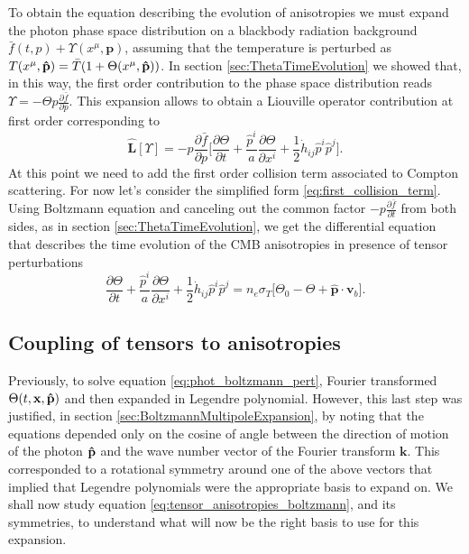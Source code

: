 To obtain the equation describing the evolution of anisotropies we must expand the photon phase space distribution on a blackbody radiation background $\bar{f}(t,p)+\Upsilon(x^\mu,\mathbf p) $, assuming that the temperature is perturbed as $T(x^\mu,\mathbf{\hat{p}})=\bar T (1+\Theta(x^\mu,\mathbf{\hat{p}}))$. In section \ref{sec:ThetaTimeEvolution} we showed that, in this way, the first order contribution to the phase space distribution reads $\Upsilon=-\Theta p\frac{\partial\bar f}{\partial p}$. This expansion allows to obtain a Liouville operator contribution at first order corresponding to 
$$\hat{\mathbf{L}}[\Upsilon]=-p\frac{\partial \bar f}{\partial p}\bigg[\frac{\partial \Theta}{\partial t}+\frac{\hat p^i}{a}\frac{\partial \Theta}{\partial x^i}+\frac{1}{2}\dot{h}_{ij}\hat p^i\hat p^j\bigg].$$
At this point we need to add the first order collision term associated to Compton scattering. For now let's consider the simplified form \eqref{eq:first_collision_term}. Using Boltzmann equation and canceling out the common factor $-p\frac{\partial\bar f}{\partial t}$ from both sides, as in section \ref{sec:ThetaTimeEvolution}, we get the differential equation that describes the time evolution of the CMB anisotropies in presence of tensor perturbations
\begin{equation}
    \label{eq:tensor_anisotropies_boltzmann}
    \frac{\partial \Theta}{\partial t}+\frac{\hat p^i}{a}\frac{\partial \Theta}{\partial x^i}+\frac{1}{2}\dot{h}_{ij}\hat p^i\hat p^j=n_{e}\sigma_T\bigg[\Theta_0-\Theta+\mathbf{\hat{p}}\cdot\mathbf{v}_{b}\bigg].
\end{equation}
\subsection{Coupling of tensors to anisotropies}
Previously, to solve equation \eqref{eq:phot_boltzmann_pert}, Fourier transformed $\Theta(t,\mathbf{x},\mathbf{\hat{p}})$ and then expanded in Legendre polynomial. However, this last step was justified, in section \ref{sec:BoltzmannMultipoleExpansion}, by noting that the equations depended only on the cosine of angle between the direction of motion of the photon $\mathbf{\hat{p}}$ and the wave number vector of the Fourier transform $\mathbf{k}$. This corresponded to a rotational symmetry around one of the above vectors that implied that Legendre polynomials were the appropriate basis to expand on. We shall now study equation \eqref{eq:tensor_anisotropies_boltzmann}, and its symmetries, to understand  what will now be the right basis to use for this expansion.


